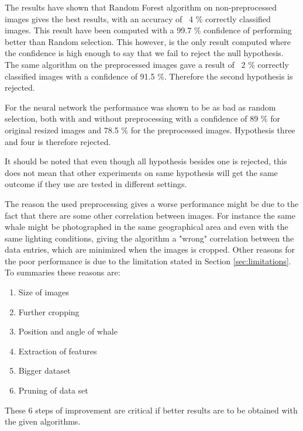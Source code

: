 The results have shown that Random Forest algorithm on non-preprocessed images gives the best results, with an accuracy of ~4 \% correctly classified images. This result have been computed with a 99.7 \% confidence of performing better than Random selection. This however, is the only result computed where the confidence is high enough to say that we fail to reject the null hypothesis.
The same algorithm on the preprocessed images gave a result of ~2 \% correctly classified images with a confidence of 91.5 \%. Therefore the second hypothesis is rejected.

For the neural network the performance was shown to be as bad as random selection, both with and without preprocessing with a confidence of 89 \% for original resized images and 78.5 \% for the preprocessed images. Hypothesis three and four is therefore rejected.

It should be noted that even though all hypothesis besides one is rejected, this does not mean that other experiments on same hypothesis will get the same outcome if they use are tested in different settings.

The reason the used preprocessing gives a worse performance might be due to the fact that there are some other correlation between images. For instance the same whale might be photographed in the same geographical area and even with the same lighting conditions, giving the algorithm a "wrong" correlation between the data entries, which are minimized when the images is cropped.
Other reasons for the poor performance is due to the limitation stated in Section \ref{sec:limitations}.
To summaries these reasons are:
\begin{enumerate}
\item Size of images 
\item Further cropping
\item Position and angle of whale
\item Extraction of features
\item Bigger dataset
\item Pruning of data set
\end{enumerate}
These 6 steps of improvement are critical if better results are to be obtained with the given algorithms. 

